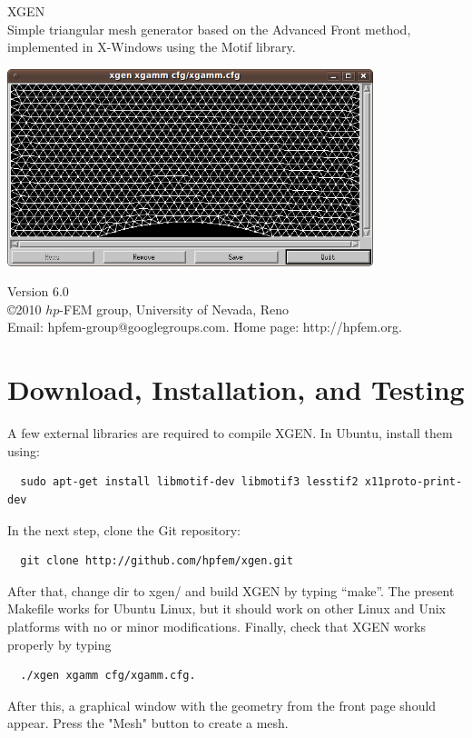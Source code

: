 \documentclass[12pt]{article}
\begin{document}
  \begin{titlepage}
  \begin{center}
\vbox{}

    \vspace{30mm}

    {\Huge  XGEN}\\[6mm]

Simple triangular mesh generator based on the Advanced Front method,\\
implemented in X-Windows using the Motif library.

    \vspace{20mm}

\begin{center}
\includegraphics[width=0.8\textwidth]{xgen-2.png}
\end{center}
    \vspace{20mm}

    Version 6.0\\
    \copyright 2010 $hp$-FEM group, University of Nevada, Reno\\
    Email: hpfem-group@googlegroups.com. Home page: http://hpfem.org.

  \end{center}
  \end{titlepage}

  \section{Download, Installation, and Testing} \label{getting}
  
  A few external libraries are required to compile XGEN. In Ubuntu, install them using:

{\footnotesize
\begin{verbatim}
  sudo apt-get install libmotif-dev libmotif3 lesstif2 x11proto-print-dev
\end{verbatim}
}
\noindent
  In the next step, clone the Git repository:
{\footnotesize
\begin{verbatim}
  git clone http://github.com/hpfem/xgen.git
\end{verbatim}
}
\noindent
\normalsize
  After that, change dir to xgen/ and build XGEN by typing ``make''. The present 
  Makefile works for Ubuntu Linux, but it should work on other Linux and Unix 
  platforms with no or minor modifications. Finally, check that XGEN works
  properly by typing 
 \noindent
{\footnotesize
\begin{verbatim}
  ./xgen xgamm cfg/xgamm.cfg.
\end{verbatim}
} 
\noindent
After this, a graphical window with the geometry from the front page 
should appear. Press the "Mesh" button to create a mesh.
\end{document}
